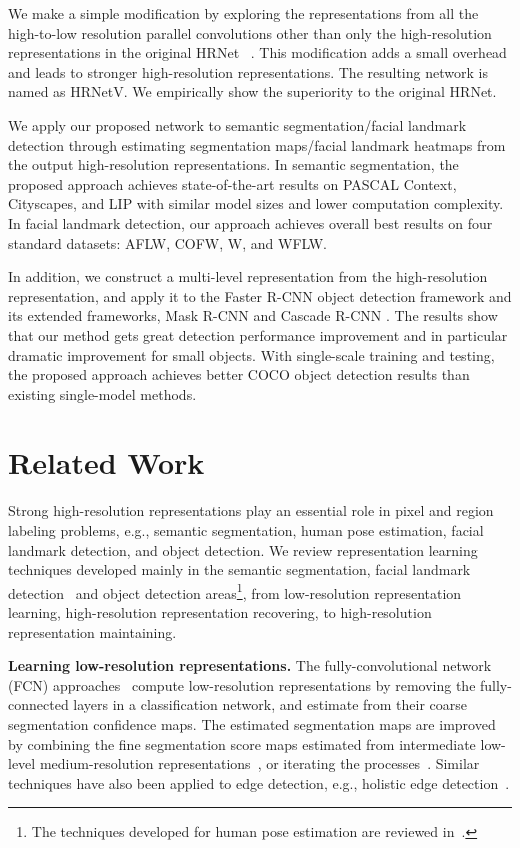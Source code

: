 \documentclass[10pt,twocolumn,letterpaper]{article}
\begin{document}
We make a simple modification
by exploring the representations
from all the high-to-low resolution parallel convolutions
other than only the high-resolution representations in the original HRNet ~\cite{SunXLW19}.
This modification adds a small overhead and
leads to stronger high-resolution representations.
The resulting network is named as HRNetV.
We empirically show the superiority to the original HRNet.





We apply our proposed network
to semantic segmentation/facial landmark detection
through estimating segmentation maps/facial landmark heatmaps
from the output high-resolution representations.
In semantic segmentation,
the proposed approach achieves
state-of-the-art results
on PASCAL Context, Cityscapes, and LIP
with similar model sizes and lower computation complexity.
In facial landmark detection,
our approach achieves overall best results
on four standard datasets: AFLW, COFW, W, and WFLW.

In addition, we construct a multi-level representation
from the high-resolution representation,
and apply it to the Faster R-CNN object detection framework
and its extended frameworks, Mask R-CNN \cite{HeGDG17} and Cascade R-CNN \cite{CaiV18}.
The results show that our method gets great detection performance improvement and in particular dramatic improvement
for small objects.
With single-scale training and testing,
the proposed approach achieves better COCO object detection results
than existing single-model methods.

\section{Related Work}
Strong high-resolution representations play an essential role
in pixel and region labeling problems,
e.g., semantic segmentation, human pose estimation, facial landmark detection,
and object detection.
We review representation learning techniques developed
mainly in the semantic segmentation,
facial landmark detection~\cite{SunWT13,KowalskiNT17,LvSXCZ17,XiaoFXLYK16,ZhangLLT14,TrigeorgisSNAZ16,ZhangSKC14} and object detection areas\footnote{The techniques developed for human pose estimation
are reviewed in~\cite{SunXLW19}.},
from low-resolution representation learning,
high-resolution representation recovering,
to high-resolution representation maintaining.


\noindent\textbf{Learning low-resolution representations.}
The fully-convolutional network (FCN) approaches~\cite{LongSD15,SermanetEZMFL13}
compute low-resolution representations
by removing the fully-connected layers in a classification network,
and estimate from their coarse segmentation confidence maps.
The estimated segmentation maps are improved
by combining the fine segmentation score maps
estimated from intermediate low-level medium-resolution representations~\cite{LongSD15},
or iterating the processes~\cite{KowalskiNT17}.
Similar techniques have also been applied
to edge detection, e.g., holistic edge detection~\cite{XieT15}.
\end{document}

